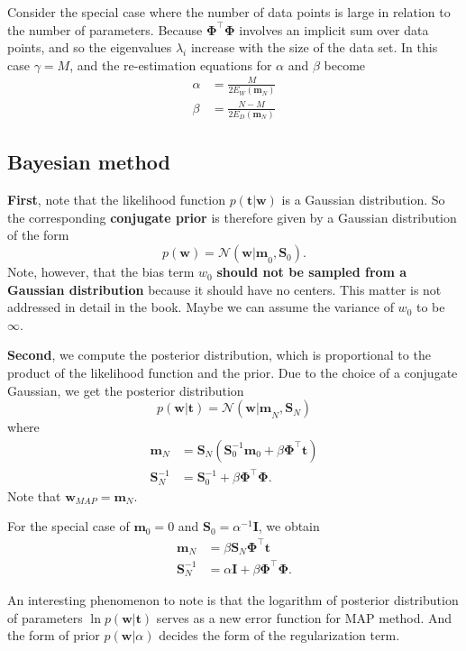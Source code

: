 \documentclass[a4paper]{report}
\renewcommand{\bf}{\mathbf}
\renewcommand{\cal}{\mathcal}
\newcommand{\bs}{\boldsymbol}
\begin{document}
Consider the special case where the number of data points is large in relation to the number of parameters. Because $\bf{\Phi}^{\intercal} \bf{\Phi}$ involves an implicit sum over data points, and so the eigenvalues $\lambda_i$ increase with the size of the data set. In this case $\gamma = M$, and the re-estimation equations for $\alpha$ and $\beta$ become
\begin{align}
	\alpha &= \frac{M}{2 E_W(\bf{m}_N)}\\
	\beta &= \frac{N-M}{2 E_D(\bf{m}_N)}
\end{align}
\subsection{Bayesian method}
\textbf{First}, note that the likelihood function $p(\bf{t}|\bf{w})$ is a Gaussian distribution. So the corresponding \textbf{conjugate prior} is therefore given by a Gaussian distribution of the form
\begin{equation}
	p(\bf{w}) = \cal{N} (\bf{w|m}_0,\bf{S}_0).
\end{equation}
Note, however, that the bias term $w_0$ \textbf{should not be sampled from a Gaussian distribution} because it should have no centers. This matter is not addressed in detail in the book. Maybe we can assume the variance of $w_0$ to be $\infty$.

\textbf{Second}, we compute the posterior distribution, which is proportional to the product of the likelihood function and the prior. Due to the choice of a conjugate Gaussian, we get the posterior distribution
\begin{equation}
	p(\bf{w|t}) = \cal{N}(\bf{w|m}_N,\bf{S}_N)
\end{equation}
where
\begin{align}
	\bf{m}_N &= \bf{S}_N (\bf{S}_0^{-1}\bf{m}_0 + \beta \bf{\Phi}^{\intercal} \bf{t}) \\
	\bf{S}_N^{-1} &= \bf{S}_0^{-1} + \beta \bf{\Phi}^{\intercal} \bf{\Phi}.
\end{align}
Note that $\bf{w}_{MAP} = \bf{m}_N$.

For the special case of $\bf{m}_0 = 0$ and $\bf{S}_0 = \alpha^{-1} \bf{I}$, we obtain
\begin{align}
	\bf{m}_N &= \beta \bf{S}_N \bs{\Phi}^{\intercal} \bf{t} \\
	\bf{S}_N^{-1} &= \alpha \bf{I} + \beta \bs{\Phi}^{\intercal} \bs{\Phi}.
\end{align}

An interesting phenomenon to note is that the logarithm of posterior distribution of parameters $\ln p(\bf{w|t})$ serves as a new error function for MAP method. And the form of prior $p(\bf{w}|\alpha)$ decides the form of the regularization term.
\end{document}
